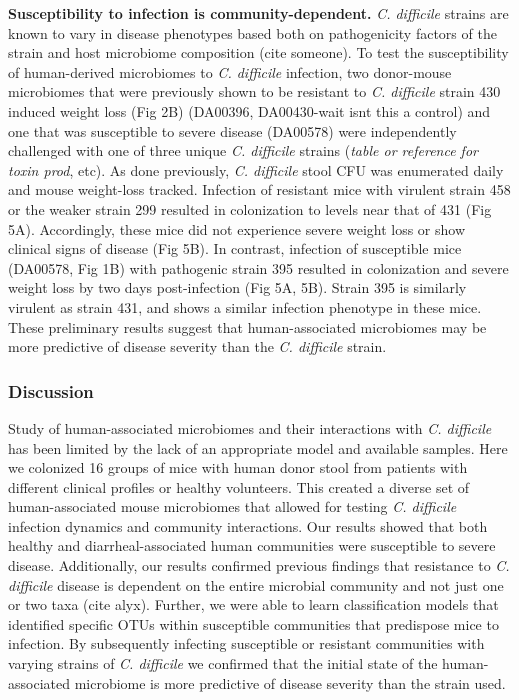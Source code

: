 \documentclass[11pt,]{article}
\begin{document}
\textbf{Susceptibility to infection is community-dependent.} \emph{C.
difficile} strains are known to vary in disease phenotypes based both on
pathogenicity factors of the strain and host microbiome composition
(cite someone). To test the susceptibility of human-derived microbiomes
to \emph{C. difficile} infection, two donor-mouse microbiomes that were
previously shown to be resistant to \emph{C. difficile} strain 430
induced weight loss (Fig 2B) (DA00396, DA00430-wait isnt this a control)
and one that was susceptible to severe disease (DA00578) were
independently challenged with one of three unique \emph{C. difficile}
strains (\emph{table or reference for toxin prod}, etc). As done
previously, \emph{C. difficile} stool CFU was enumerated daily and mouse
weight-loss tracked. Infection of resistant mice with virulent strain
458 or the weaker strain 299 resulted in colonization to levels near
that of 431 (Fig 5A). Accordingly, these mice did not experience severe
weight loss or show clinical signs of disease (Fig 5B). In contrast,
infection of susceptible mice (DA00578, Fig 1B) with pathogenic strain
395 resulted in colonization and severe weight loss by two days
post-infection (Fig 5A, 5B). Strain 395 is similarly virulent as strain
431, and shows a similar infection phenotype in these mice. These
preliminary results suggest that human-associated microbiomes may be
more predictive of disease severity than the \emph{C. difficile} strain.

\subsubsection{Discussion}\label{discussion}

Study of human-associated microbiomes and their interactions with
\emph{C. difficile} has been limited by the lack of an appropriate model
and available samples. Here we colonized 16 groups of mice with human
donor stool from patients with different clinical profiles or healthy
volunteers. This created a diverse set of human-associated mouse
microbiomes that allowed for testing \emph{C. difficile} infection
dynamics and community interactions. Our results showed that both
healthy and diarrheal-associated human communities were susceptible to
severe disease. Additionally, our results confirmed previous findings
that resistance to \emph{C. difficile} disease is dependent on the
entire microbial community and not just one or two taxa (cite alyx).
Further, we were able to learn classification models that identified
specific OTUs within susceptible communities that predispose mice to
infection. By subsequently infecting susceptible or resistant
communities with varying strains of \emph{C. difficile} we confirmed
that the initial state of the human-associated microbiome is more
predictive of disease severity than the strain used.
\end{document}
